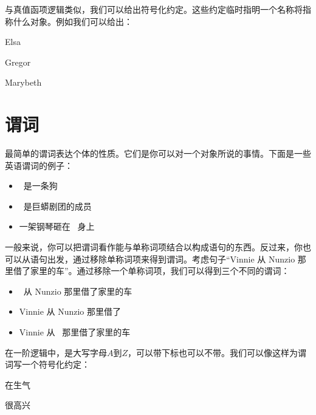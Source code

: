 与真值函项逻辑类似，我们可以给出符号化约定。这些约定临时指明一个名称将指称什么对象。例如我们可以给出：


\begin{ekey}
		\item[e] Elsa
		\item[g] Gregor
		\item[m] Marybeth
	\end{ekey}

\section{谓词}
最简单的谓词表达个体的性质。它们是你可以对一个对象所说的事情。下面是一些英语谓词的例子：


\begin{itemize}
		\item \blank\ 是一条狗
		\item \blank\ 是巨蟒剧团的成员
		\item 一架钢琴砸在 \blank\ 身上
	\end{itemize}


一般来说，你可以把谓词看作能与单称词项结合以构成语句的东西。反过来，你也可以从语句出发，通过移除单称词项来得到谓词。考虑句子“Vinnie 从 Nunzio 那里借了家里的车”。通过移除一个单称词项，我们可以得到三个不同的谓词：


\begin{itemize}
		\item \blank\ 从 Nunzio 那里借了家里的车\\
		\item Vinnie 从 Nunzio 那里借了 \blank\\
		\item Vinnie 从 \blank\ 那里借了家里的车
	\end{itemize}


在一阶逻辑中，是大写字母$A$到$Z$，可以带下标也可以不带。我们可以像这样为谓词写一个符号化约定：


\begin{ekey}
		\item[\atom{A}{x}]  在生气
		\item[\atom{H}{x}]  很高兴
	\end{ekey}


